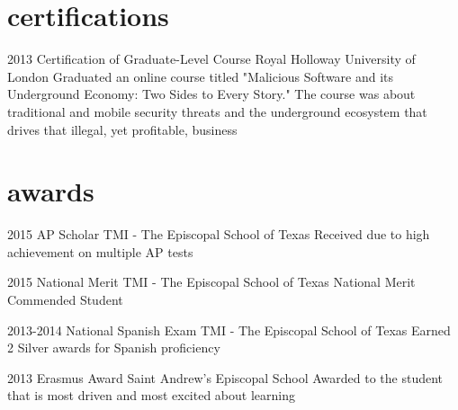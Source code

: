 \documentclass[]{friggeri-cv} %
\begin{document}
\section{certifications}

\begin{entrylist}
	

\entry
{2013}
{Certification of Graduate-Level Course}
{Royal Holloway University of London}
{Graduated an online course titled "Malicious Software and its Underground Economy: Two Sides to Every Story." The course was about traditional and mobile security threats and the underground ecosystem that drives that illegal, yet profitable, business}

	
\end{entrylist} 

\pagebreak

\section{awards}

\begin{entrylist}
	

\entry
{2015}
{AP Scholar}
{TMI - The Episcopal School of Texas}
{Received due to high achievement on multiple AP tests}


\entry
{2015}
{National Merit}
{TMI - The Episcopal School of Texas}
{National Merit Commended Student}


\entry
{2013-2014}
{National Spanish Exam}
{TMI - The Episcopal School of Texas}
{Earned 2 Silver awards for Spanish proficiency}


\entry
{2013}
{Erasmus Award}
{Saint Andrew's Episcopal School}
{Awarded to the student that is most driven and most excited about learning}

	
\end{entrylist}


\end{document}
